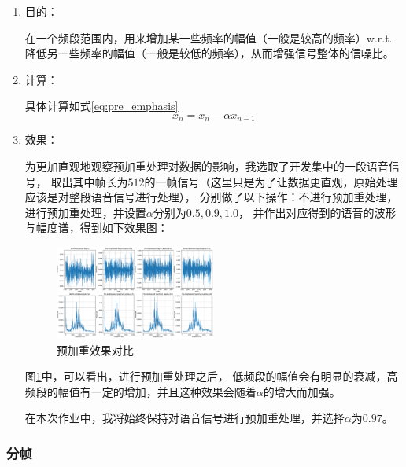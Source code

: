 \documentclass[a4paper]{article}
\begin{document}
\begin{enumerate}
  \item 
  {
    目的：

    在一个频段范围内，用来增加某一些频率的幅值（一般是较高的频率）w.r.t.
    降低另一些频率的幅值（一般是较低的频率），从而增强信号整体的信噪比。
  }
  \item 
  {
    计算：

    具体计算如式\ref{eq:pre_emphasis}
    \begin{equation}
      x_n = x_n - \alpha x_{n-1}
      \label{eq:pre_emphasis}
    \end{equation}
  }
  \item 
  {
    效果：

    为更加直观地观察预加重处理对数据的影响，我选取了开发集中的一段语音信号，
    取出其中帧长为$512$的一帧信号（这里只是为了让数据更直观，原始处理应该是对整段语音信号进行处理），
    分别做了以下操作：不进行预加重处理，进行预加重处理，并设置$\alpha$分别为$0.5, 0.9, 1.0$，
    并作出对应得到的语音的波形与幅度谱，得到如下效果图：
    \begin{figure}[H]
      \centering
      \includegraphics[width=0.5\textwidth]{figs/counting_on_pre_emphasis.pdf}
      \caption{预加重效果对比}
      \label{fig:counting_on_pre_emphasis}
    \end{figure}

    图\ref{fig:counting_on_pre_emphasis}中，可以看出，进行预加重处理之后，
    低频段的幅值会有明显的衰减，高频段的幅值有一定的增加，并且这种效果会随着$\alpha$的增大而加强。

    在本次作业中，我将始终保持对语音信号进行预加重处理，并选择$\alpha$为$0.97$。
  }
\end{enumerate}

\subsubsection{分帧}
\end{document}
